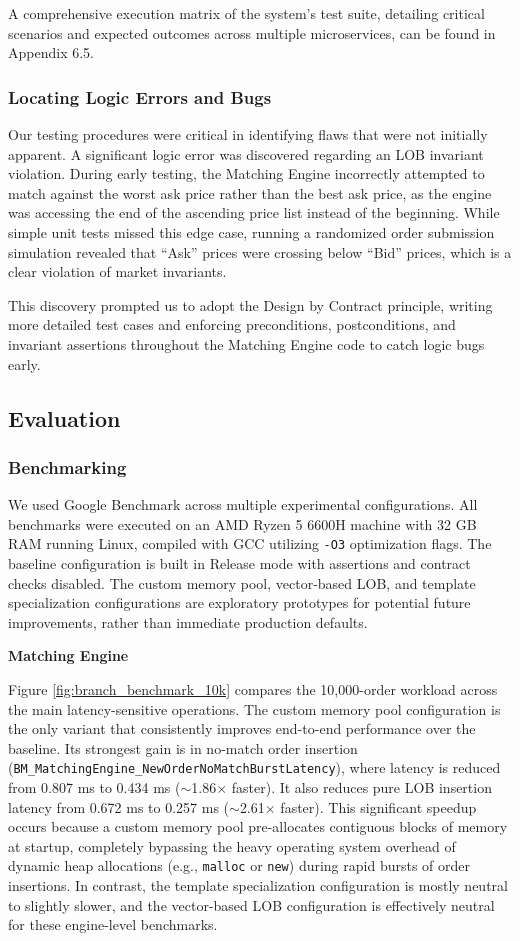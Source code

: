 \documentclass[12pt,a4paper]{article}
\begin{document}
A comprehensive execution matrix of the system's test suite, detailing critical scenarios and expected outcomes across multiple microservices, can be found in Appendix 6.5.

\subsubsection{Locating Logic Errors and Bugs}
Our testing procedures were critical in identifying flaws that were not initially apparent. A significant logic error was discovered regarding an LOB invariant violation. During early testing, the Matching Engine incorrectly attempted to match against the worst ask price rather than the best ask price, as the engine was accessing the end of the ascending price list instead of the beginning. While simple unit tests missed this edge case, running a randomized order submission simulation revealed that ``Ask'' prices were crossing below ``Bid'' prices, which is a clear violation of market invariants.

This discovery prompted us to adopt the Design by Contract principle, writing more detailed test cases and enforcing preconditions, postconditions, and invariant assertions throughout the Matching Engine code to catch logic bugs early.

\subsection{Evaluation}
\subsubsection{Benchmarking}
We used Google Benchmark across multiple experimental configurations. All benchmarks were executed on an AMD Ryzen 5 6600H machine with 32 GB RAM running Linux, compiled with GCC utilizing \texttt{-O3} optimization flags. The baseline configuration is built in Release mode with assertions and contract checks disabled. The custom memory pool, vector-based LOB, and template specialization configurations are exploratory prototypes for potential future improvements, rather than immediate production defaults.

\noindent\textbf{Matching Engine}

Figure \ref{fig:branch_benchmark_10k} compares the 10,000-order workload across the main latency-sensitive operations. The custom memory pool configuration is the only variant that consistently improves end-to-end performance over the baseline. Its strongest gain is in no-match order insertion (\texttt{BM\_MatchingEngine\_NewOrderNoMatchBurstLatency}), where latency is reduced from 0.807 ms to 0.434 ms ($\sim$1.86$\times$ faster). It also reduces pure LOB insertion latency from 0.672 ms to 0.257 ms ($\sim$2.61$\times$ faster). This significant speedup occurs because a custom memory pool pre-allocates contiguous blocks of memory at startup, completely bypassing the heavy operating system overhead of dynamic heap allocations (e.g., \texttt{malloc} or \texttt{new}) during rapid bursts of order insertions. In contrast, the template specialization configuration is mostly neutral to slightly slower, and the vector-based LOB configuration is effectively neutral for these engine-level benchmarks.
\end{document}
